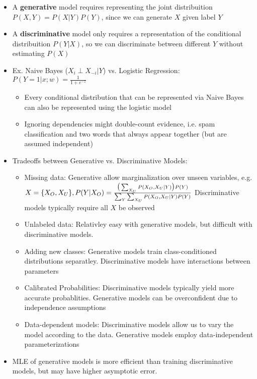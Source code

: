 \documentclass{article}
\begin{document}
\begin{itemize}
    \item A \textbf{generative} model requires representing the joint distribuition $P(X, Y) = P(X|Y)P(Y)$, since we can generate $X$ given label $Y$ 
    \item A \textbf{discriminative} model only requires a representation of the conditional distribuition $P(Y | X)$, so we can discriminate between different $Y$ without estimating $P(X)$
    \item Ex. Naive Bayes ($X_i \perp X_{-i} | Y$) vs. Logistic Regression: $P(Y = 1 | x; w) = \frac{1}{1 + e^{-z}}$ \begin{itemize}
        \item Every conditional distribution that can be represented via Naive Bayes can also be represented using the logistic model 
        \item Ignoring dependencies might double-count evidence, i.e. spam classification and two words that always appear together (but are assumed independent)
    \end{itemize}
    \item Tradeoffs between Generative vs. Discriminative Models: \begin{itemize}
        \item Missing data: Generative allow marginalization over unseen variables, e.g. $X = \{X_O, X_U\}, \\ P(Y|X_O) = \frac{\big(\sum_{X_U} P(X_O, X_U | Y)\big)P(Y)}{\sum_Y \sum_{X_U}P(X_O, X_U | Y) P(Y)}$ Discriminative models typically require all $X$ be observed 
        \item Unlabeled data: Relativley easy with generative models, but difficult with discriminative models. 
        \item Adding new classes: Generative models train class-conditioned distributions separatley. Discriminative models have interactions between parameters
        \item Calibrated Probabilities: Discriminative models typically yield more accurate probablities. Generative models can be overconfident due to independence assumptions 
        \item Data-dependent models: Discriminative models allow us to vary the model according to the data. Generative models employ data-independent parameterizations 
    \end{itemize}
    \item MLE of generative models is more efficient than training discriminative models, but may have higher asymptotic error. 
\end{itemize}
\end{document}
